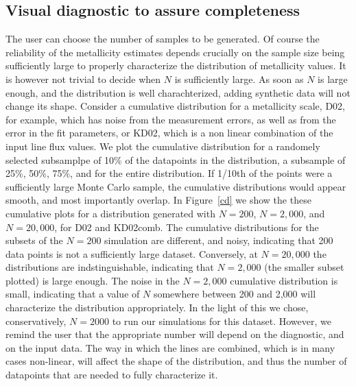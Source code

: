 \documentclass{emulateapj}
\begin{document}
\subsection{Visual diagnostic to assure completeness}
The user can choose the number of samples to be generated. Of course the reliability of the metallicity estimates depends crucially on the sample size being sufficiently large to properly characterize the distribution of metallicity values. It is however not trivial to decide when $N$ is sufficiently large. As soon as $N$ is large enough, and the distribution is well charachterized, adding synthetic data will not change its shape. Consider a cumulative distribution for a metallicity scale, D02, for example, which has noise from the measurement errors, as well as from the error in the fit parameters, or KD02, which is a non linear combination of the input line flux values. We plot the cumulative distribution for a randomely selected subsamplpe of 10\% of the datapoints in the distribution, a subsample of 25\%, 50\%, 75\%, and for the entire distribution. If 1/10th of the points were a sufficiently large Monte Carlo sample, the cumulative distributions would appear smooth, and most importantly overlap. In Figure~\ref{cd} we show the these cumulative plots for a distribution generated with $N=200$, $N=2,000$, and $N=20,000$, for D02 and KD02comb. The cumulative distributions for the subsets of the $N=200$ simulation are different, and noisy, indicating that 200 data points is not a sufficiently large dataset. Conversely, at $N=20,000$ the distributions are indstinguishable, indicating that $N=2,000$ (the smaller subset plotted) is large enough. The noise in the $N=2,000$ cumulative distribution is small, indicating that a value of $N$ somewhere between 200 and 2,000 will characterize the distribution appropriately.  In the light of this we chose, conservatively, $N=2000$ to run our simulations for this dataset. However, we remind the user that the appropriate number will depend on the diagnostic, and on the input data. The way in which the lines are combined, which is in many cases non-linear, will affect the shape of the distribution, and thus the number of datapoints that are needed to fully characterize it. 
\end{document}
